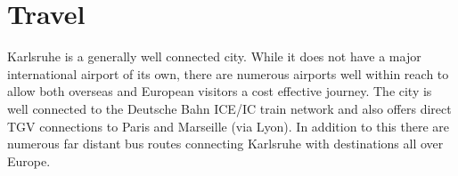 
\newpage


\vspace*{5cm}

\section{Travel}

Karlsruhe is a generally well connected city. While it does not have a major
international airport of its own, there are numerous airports well within reach
to allow both overseas and European visitors a cost effective journey. The city
is well connected to the Deutsche Bahn ICE/IC train network and also offers
direct TGV connections to Paris and Marseille (via Lyon). In addition to this
there are numerous far distant bus routes connecting Karlsruhe with destinations
all over Europe.


